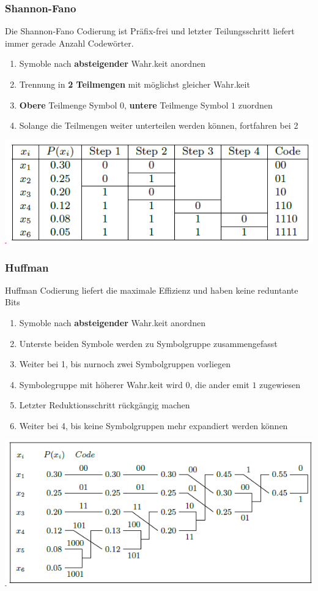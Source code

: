 \subsubsection{Shannon-Fano}
Die Shannon-Fano Codierung ist Präfix-frei und letzter Teilungsschritt liefert immer gerade Anzahl Codewörter.
\begin{enumerate}[nosep]
	\item Symoble nach \textbf{absteigender} Wahr.keit anordnen
	\item Trennung in \textbf{2 Teilmengen} mit möglichst gleicher Wahr.keit
	\item \textbf{Obere} Teilmenge Symbol $0$, \textbf{untere} Teilmenge Symbol $1$ zuordnen
	\item Solange die Teilmengen weiter unterteilen werden können, fortfahren bei 2
\end{enumerate}
\begin{center}
	\includegraphics[width=\columnwidth]{Images/shannon-fano}
\end{center}

\subsubsection{Huffman}
Huffman Codierung liefert die maximale Effizienz und haben keine reduntante Bits
\begin{enumerate}[nosep]
	\item Symoble nach \textbf{absteigender} Wahr.keit anordnen
	\item Unterste beiden Symbole werden zu Symbolgruppe zusammengefasst
	\item Weiter bei 1, bis nurnoch zwei Symbolgruppen vorliegen
	\item Symbolegruppe mit höherer Wahr.keit wird $0$, die ander emit $1$ zugewiesen
	\item Letzter Reduktionsschritt rückgängig machen
	\item Weiter bei 4, bis keine Symbolgruppen mehr expandiert werden können
\end{enumerate}
\begin{center}
	\includegraphics[width=\columnwidth]{Images/huffman}
\end{center}
